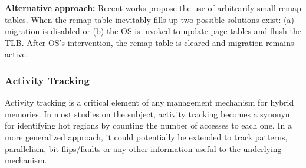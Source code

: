 
	\textbf{Alternative approach:} Recent works  propose the use of arbitrarily small remap tables. When the remap table inevitably fills up two possible solutions exist: (a) migration is disabled or (b) the OS is invoked to update page tables and flush the TLB. After OS's intervention, the remap table is cleared and migration remains active.


%


\subsubsection{Activity Tracking}
\label{sec:tracking}

Activity tracking is a critical element of any management mechanism for hybrid memories. In most studies on the subject, activity tracking becomes a synonym for identifying hot regions by counting the number of accesses to each one. In a more generalized approach, it could potentially be extended to track patterns, parallelism, bit flips/faults or any other information useful to the underlying mechanism. %

